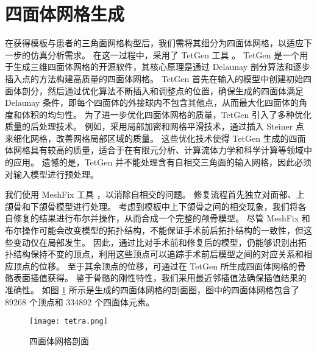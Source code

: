 \section{四面体网格生成}

在获得模板与患者的三角面网格构型后，我们需将其细分为四面体网格，以适应下一步的仿真分析需求。
在这一过程中，采用了 TetGen 工具 \cite{siTetGenDelaunaybasedQuality2015}。
TetGen 是一个用于生成三维四面体网格的开源软件，其核心原理是通过 Delaunay 剖分算法和逐步插入点的方法构建高质量的四面体网格。
TetGen 首先在输入的模型中创建初始四面体剖分，然后通过优化算法不断插入和调整点的位置，确保生成的四面体满足 Delaunay 条件，即每个四面体的外接球内不包含其他点，从而最大化四面体的角度和体积的均匀性。
为了进一步优化四面体网格的质量，TetGen 引入了多种优化质量的后处理技术。
例如，采用局部加密和网格平滑技术，通过插入 Steiner 点来细化网格，改善网格局部区域的质量。
这些优化技术使得 TetGen 生成的四面体网格具有较高的质量，适合于在有限元分析、计算流体力学和科学计算等领域中的应用。
遗憾的是，TetGen 并不能处理含有自相交三角面的输入网格，因此必须对输入模型进行预处理。

我们使用 MeshFix 工具 \cite{atteneLightweightApproachRepairing2010}，以消除自相交的问题。
修复流程首先独立对面部、上颌骨和下颌骨模型进行处理。
考虑到模板中上下颌骨之间的相交现象，我们将各自修复的结果进行布尔并操作，从而合成一个完整的颅骨模型。
尽管 MeshFix 和布尔操作可能会改变模型的拓扑结构，不能保证手术前后拓扑结构的一致性，但这些变动仅在局部发生。
因此，通过比对手术前和修复后的模型，仍能够识别出拓扑结构保持不变的顶点，利用这些顶点可以追踪手术前后模型之间的对应关系和相应顶点的位移。
至于其余顶点的位移，可通过在 TetGen 所生成四面体网格的骨骼表面插值获得。
鉴于骨骼的刚性特性，我们采用最近邻插值法确保插值结果的准确性。
如图 \ref{fig:tetra} 所示是生成的四面体网格的剖面图，图中的四面体网格包含了 \num{89268} 个顶点和 \num{334892} 个四面体元素。

\begin{figure}
  \centering
  \texttt{[image: tetra.png]}
  \caption{四面体网格剖面}
  \label{fig:tetra}
\end{figure}
